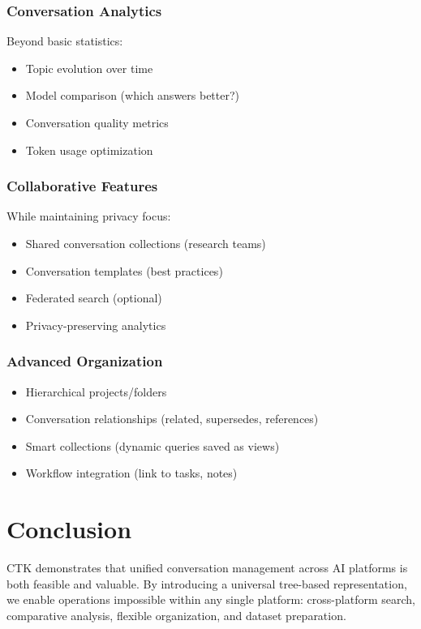 \documentclass[11pt,letterpaper]{article}
\begin{document}
\subsubsection{Conversation Analytics}

Beyond basic statistics:
\begin{itemize}
    \item Topic evolution over time
    \item Model comparison (which answers better?)
    \item Conversation quality metrics
    \item Token usage optimization
\end{itemize}

\subsubsection{Collaborative Features}

While maintaining privacy focus:
\begin{itemize}
    \item Shared conversation collections (research teams)
    \item Conversation templates (best practices)
    \item Federated search (optional)
    \item Privacy-preserving analytics
\end{itemize}

\subsubsection{Advanced Organization}

\begin{itemize}
    \item Hierarchical projects/folders
    \item Conversation relationships (related, supersedes, references)
    \item Smart collections (dynamic queries saved as views)
    \item Workflow integration (link to tasks, notes)
\end{itemize}

\section{Conclusion}
\label{sec:conclusion}

CTK demonstrates that unified conversation management across AI platforms is both feasible and valuable. By introducing a universal tree-based representation, we enable operations impossible within any single platform: cross-platform search, comparative analysis, flexible organization, and dataset preparation.
\end{document}
